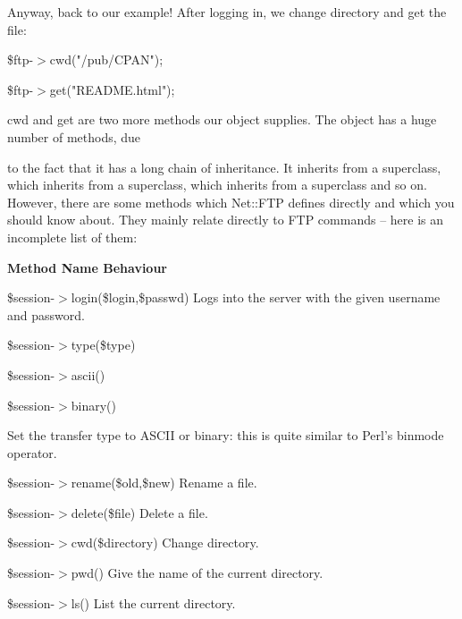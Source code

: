 \documentclass[a4paper,11pt]{book}
\begin{document}
\noindent 

\noindent Anyway, back to our example! After logging in, we change directory and get the file:

\noindent 

\noindent 

\noindent \$ftp-$>$cwd("/pub/CPAN");

\noindent \$ftp-$>$get("README.html");

\noindent 

\noindent cwd and get are two more methods our object supplies. The object has a huge number of methods, due

\noindent to the fact that it has a long chain of inheritance. It inherits from a superclass, which inherits from a superclass, which inherits from a superclass and so on. However, there are some methods which Net::FTP defines directly and which you should know about. They mainly relate directly to FTP commands -- here is an incomplete list of them:

\noindent 

\noindent 

\noindent \textbf{Method Name Behaviour}

\noindent 

\noindent \$session-$>$login(\$login,\$passwd) Logs into the server with the given username and password.

\noindent 

\noindent \$session-$>$type(\$type)

\noindent \$session-$>$ascii()

\noindent \$session-$>$binary()

\noindent 

\noindent Set the transfer type to ASCII or binary: this is quite similar to Perl's binmode operator.

\noindent 

\noindent \$session-$>$rename(\$old,\$new) Rename a file.

\noindent 

\noindent \$session-$>$delete(\$file) Delete a file.

\noindent 

\noindent \$session-$>$cwd(\$directory) Change directory.

\noindent 

\noindent \$session-$>$pwd() Give the name of the current directory.

\noindent 

\noindent \$session-$>$ls() List the current directory.
\end{document}
